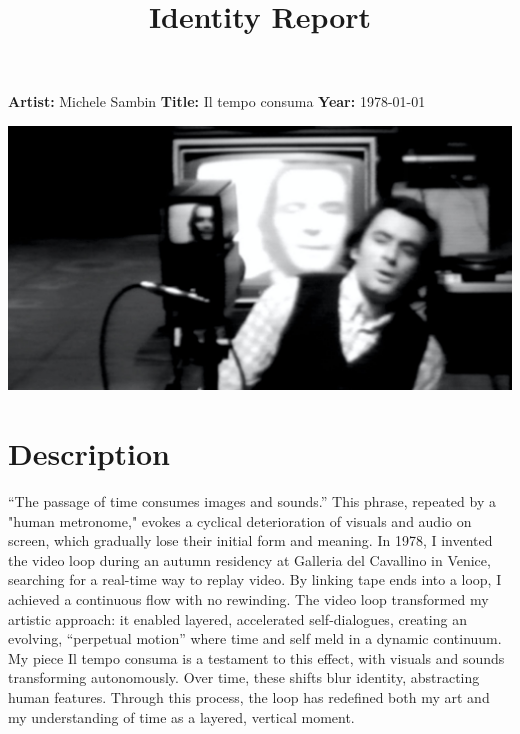 \documentclass[a4paper,12pt]{article}
\begin{document}
    \title{Identity Report}
    \maketitle
    \noindent
    \begin{minipage}{0.5\textwidth}
        \large\textbf{Artist:} Michele Sambin\newline
        \large\textbf{Title:}  Il tempo consuma\newline
        \large\textbf{Year:}  1978-01-01\newline
    \end{minipage}
    \hfill
    \begin{minipage}{0.48\textwidth} 
        \centering
        \includegraphics[width=\textwidth]{image.jpg}
    \end{minipage}

    \section*{Description}
    “The passage of time consumes images and sounds.” This phrase, repeated by a "human metronome," evokes a cyclical deterioration of visuals and audio on screen, which gradually lose their initial form and meaning. In 1978, I invented the video loop during an autumn residency at Galleria del Cavallino in Venice, searching for a real-time way to replay video. By linking tape ends into a loop, I achieved a continuous flow with no rewinding. The video loop transformed my artistic approach: it enabled layered, accelerated self-dialogues, creating an evolving, “perpetual motion” where time and self meld in a dynamic continuum. My piece Il tempo consuma is a testament to this effect, with visuals and sounds transforming autonomously. Over time, these shifts blur identity, abstracting human features. Through this process, the loop has redefined both my art and my understanding of time as a layered, vertical moment.
\end{document}
